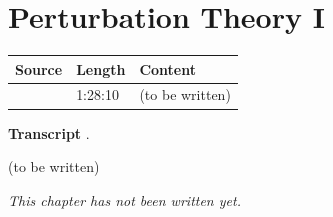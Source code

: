 \chapter{Perturbation Theory I}\label{ch:c24}
\begin{paracol}{2}

\begin{sources}
\begin{tabularx}{\linewidth}{@{}l l L@{}}
\toprule
\textbf{Source} & \textbf{Length} & \textbf{Content}\\
\midrule
{} & 1:28:10 & (to be written)\\
\bottomrule
\end{tabularx}

\smallskip
\textbf{Transcript} .
\end{sources}

\begin{reading}
(to be written)
\end{reading}

\emph{This chapter has not been written yet.}

\flushside
\end{paracol}
